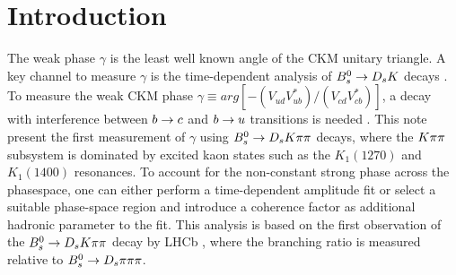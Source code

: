 
\section{Introduction}
\label{sec:Introduction}

The weak phase $\gamma$ is the least well known angle of the CKM unitary triangle. 
A key channel to measure $\gamma$ is the time-dependent analysis of ${{B}^0_{s}}\rightarrow{\ensuremath{{D}_{s}}}{\ensuremath{K}}$ decays \cite{Fleischer:2003yb,DeBruyn:2012jp}. 
To measure the weak CKM phase $\gamma \equiv arg[-(V_{ud}V_{ub}^{*})/(V_{cd}V_{cb}^{*})]$, a decay with interference between ${b}\rightarrow{\ensuremath{c}}$ and ${b}\rightarrow{\ensuremath{u}}$ transitions is needed \cite{Fleischer:2003yb}.
This note present the first measurement of $\gamma$ using ${{B}^0_{s}}\rightarrow{\ensuremath{{D}_{s}}}{\ensuremath{K}}\pi\pi$ decays, where the ${K}{\pi}{\pi}$ subsystem 
is dominated by excited kaon states such as the $K_{1}(1270)$ and $K_{1}(1400)$ resonances.
To account for the non-constant strong phase across the phasespace, 
one can either perform a time-dependent amplitude fit 
or select a suitable phase-space region and introduce a coherence factor as additional hadronic parameter to the fit.
This analysis is based on the first observation of the ${{B}^0_{s}}\rightarrow{\ensuremath{{D}_{s}}}{\ensuremath{K}}{\ensuremath{\pi}}{\ensuremath{\pi}}$ decay by LHCb \cite{Blusk:1471393,Blusk:2012it}, where the branching ratio is measured relative to ${{B}^0_{s}}\rightarrow{\ensuremath{{D}_{s}}}{\ensuremath{\pi}}{\ensuremath{\pi}}{\ensuremath{\pi}}$.
